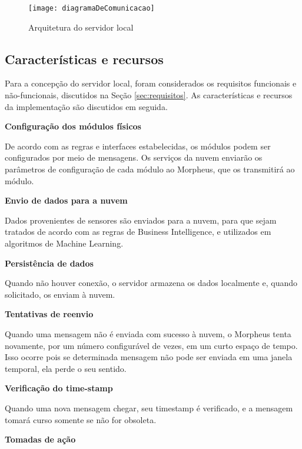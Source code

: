 \begin{figure}
	\centering
	\caption{Arquitetura do servidor local}
  \texttt{[image: diagramaDeComunicacao]}
\label{fig:diagramaDeComunicacao}
\end{figure}

\subsection{Características e recursos}
Para a concepção do servidor local, foram considerados os requisitos funcionais e não-funcionais, discutidos na Seção \ref{sec:requisitos}. As características e recursos da implementação são discutidos em seguida.

\begin{description}

\item \textbf{Configuração dos módulos físicos}

De acordo com as regras e interfaces estabelecidas, os módulos podem ser configurados por meio de mensagens. Os serviços da nuvem enviarão os parâmetros de configuração de cada módulo ao Morpheus, que os transmitirá ao módulo.

\item \textbf{Envio de dados para a nuvem}

Dados provenientes de sensores são enviados para a nuvem, para que sejam tratados de acordo com as regras de Business Intelligence, e utilizados em algoritmos de Machine Learning.

\item \textbf{Persistência de dados}

Quando não houver conexão, o servidor armazena os dados localmente e, quando solicitado, os enviam à nuvem.

\item \textbf{Tentativas de reenvio}

Quando uma mensagem não é enviada com sucesso à nuvem, o Morpheus tenta novamente, por um número configurável de vezes, em um
curto espaço de tempo. Isso ocorre pois se determinada mensagem não pode ser enviada em uma janela temporal, ela perde o seu sentido.

\item \textbf{Verificação do time-stamp}

Quando uma nova mensagem chegar, seu timestamp é verificado, e a mensagem tomará curso somente se não for obsoleta.

\item \textbf{Tomadas de ação}


\end{description}
